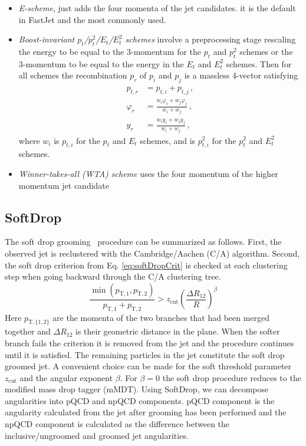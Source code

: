 \begin{itemize}
	\item \emph{E-scheme}, just adds the four momenta of the jet candidates.  it is the default in FastJet and the most commonly used.
	\item \emph{Boost-invariant $p_t$/$p_t^2$/$E_t$/$E_t^2$ schemes} involve a preprocessing stage rescaling the energy to be equal to the 3-momentum for the
	$p_t$ and $p_t^2$ schemes or the 3-momentum to be equal to
	the energy in the $E_t$ and $E_t^2$ schemes. Then for all schemes the
	recombination $p_r$ of $p_i$ and $p_j$ is a massless 4-vector
	satisfying
	\begin{subequations}
		\begin{align}
			p_{t,r} &= p_{t,i} + p_{t,j}\,,\\
			\varphi_r &= \frac{w_i \varphi_i + w_j \varphi_j}{w_i + w_j}\,,\\
			y_r &= \frac{w_i y_i + w_j y_j}{w_i + w_j}\,,
		\end{align}
	\end{subequations}
	where $w_i$ is $p_{t,i}$ for the $p_t$ and $E_t$ schemes, and is
	$p_{t,i}^2$ for the $p_t^2$ and $E_t^2$ schemes. 
\item \emph{Winner-takes-all (WTA) scheme} uses the four momentum of the higher momentum jet candidate
\end{itemize}

\subsection{SoftDrop}
The soft drop grooming~\cite{SoftDrop_Larkoski_2014} procedure can be summarized as follows. First, the observed jet is reclustered with the Cambridge/Aachen (C/A) algorithm.
Second, the soft drop criterion from Eq. \ref{eq:softDropCrit} is checked at each clustering step when going backward through the C/A clustering tree.
\begin{equation}
	\label{eq:softDropCrit}
	\frac{\min(p_\mathrm{T,1}, p_\mathrm{T, 2})}{p_\mathrm{T,1} + p_\mathrm{T, 2}} > z_\mathrm{cut} \left(\frac{\Delta R_{12}}{R}\right)^\beta
\end{equation}
Here \(p_\mathrm{T, \{1,2\}}\) are the momenta of the two branches that had been merged together and \(\Delta R_{12}\) is their geometric distance in the \etaphi plane. 
%
When the softer branch fails the criterion it is removed from the jet and the procedure continues until it is satisfied. 
%
The remaining particles in the jet constitute the soft drop groomed jet. 
%
A convenient choice can be made for the soft threshold parameter \(z_\mathrm{cut}\) and the angular exponent \(\beta\). 
%
For \(\beta = 0\) the soft drop procedure reduces to the modified mass drop tagger (mMDT). 
%
Using SoftDrop, we can decompose angularities into pQCD and npQCD components. 
%
pQCD component is the angularity calculated from the jet after grooming has been performed and the npQCD component is calculated as the difference between the inclusive/ungroomed and groomed jet angularities. 

